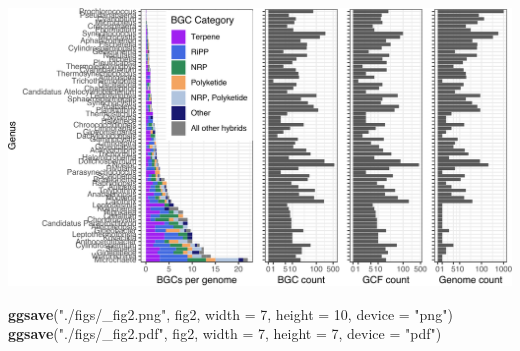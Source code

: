 \documentclass[
]{article}
\newenvironment{Shaded}{\begin{snugshade}}{\end{snugshade}}
\newcommand{\AttributeTok}[1]{\textcolor[rgb]{0.13,0.29,0.53}{#1}}
\newcommand{\DecValTok}[1]{\textcolor[rgb]{0.00,0.00,0.81}{#1}}
\newcommand{\FunctionTok}[1]{\textcolor[rgb]{0.13,0.29,0.53}{\textbf{#1}}}
\newcommand{\NormalTok}[1]{#1}
\newcommand{\StringTok}[1]{\textcolor[rgb]{0.31,0.60,0.02}{#1}}
\begin{document}
\includegraphics{analysis_files/figure-latex/unnamed-chunk-16-1.pdf}

\begin{Shaded}
\begin{Highlighting}[]
\FunctionTok{ggsave}\NormalTok{(}\StringTok{"./figs/\_fig2.png"}\NormalTok{, fig2, }\AttributeTok{width =} \DecValTok{7}\NormalTok{, }\AttributeTok{height =} \DecValTok{10}\NormalTok{, }\AttributeTok{device =} \StringTok{"png"}\NormalTok{)}
\FunctionTok{ggsave}\NormalTok{(}\StringTok{"./figs/\_fig2.pdf"}\NormalTok{, fig2, }\AttributeTok{width =} \DecValTok{7}\NormalTok{, }\AttributeTok{height =} \DecValTok{7}\NormalTok{, }\AttributeTok{device =} \StringTok{"pdf"}\NormalTok{)}
\end{Highlighting}
\end{Shaded}
\end{document}

